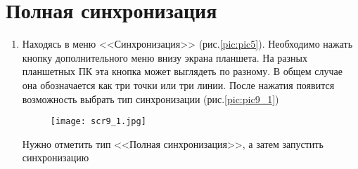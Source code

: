 \section{Полная синхронизация}
\begin{enumerate}[\thesection .1]
	\item Находясь в меню <<Синхронизация>> (рис.\ref{pic:pic5}). Необходимо нажать кнопку дополнительного меню внизу экрана планшета. На разных планшетных ПК эта кнопка может выглядеть по разному. В общем случае она обозначается как три точки или три линии.
	После нажатия появится возможность выбрать тип синхронизации
	(рис.\ref{pic:pic9_1})
	\begin{figure}[!h]
		\begin{floatrow}
			{\texttt{[image: scr9\_1.jpg]}}
		\end{floatrow}
	\end{figure}
	Нужно отметить тип <<Полная синхронизация>>, а затем запустить синхронизацию
\end{enumerate}
